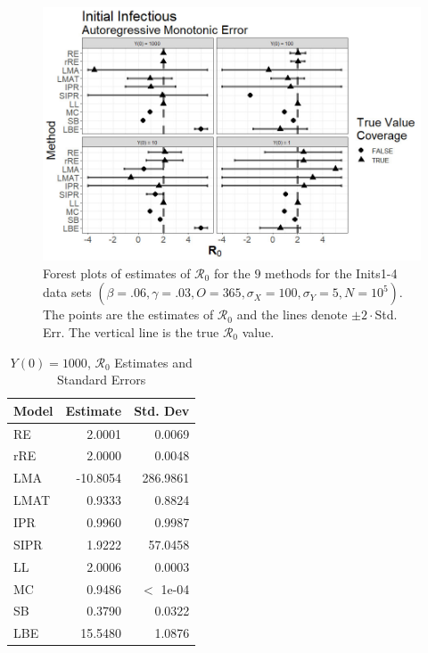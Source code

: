 \documentclass[12pt]{article}
\newcommand{\xxsir}{\ensuremath{9} } %
\newcommand{\rr}{\ensuremath{\mathcal{R}_0}}
\begin{document}
\begin{figure}[H]
	\centering
	\includegraphics[scale=0.5]{images/start_arm.jpg}
	\caption{Forest plots of estimates of $\rr$ for the \xxsir methods for the Inits1-4 data sets $(\beta=.06, \gamma=.03, O=365, \sigma_X=100, \sigma_Y=5, N=10^5)$.  The points are the estimates of $\rr$ and the lines denote $\pm 2\cdot $Std. Err.  The vertical line is the true $\rr$ value.}
\end{figure}


\begin{table}[H]
	
	\centering
	\begin{tabular}[t]{l|r|r}
		\hline
		Model & Estimate & Std. Dev\\
		\hline
		RE & 2.0001 & 0.0069\\
		\hline
		rRE & 2.0000 & 0.0048\\
		\hline
		LMA & -10.8054 & 286.9861\\
		\hline
		LMAT & 0.9333 & 0.8824\\
		\hline
		IPR & 0.9960 & 0.9987\\
		\hline
		SIPR & 1.9222 & 57.0458\\
		\hline
		LL & 2.0006 & 0.0003\\
		\hline
		MC & 0.9486 & $<$ 1e-04\\
		\hline
		SB & 0.3790 & 0.0322\\
		\hline
		LBE & 15.5480 & 1.0876\\
		\hline
	\end{tabular}
	\caption{$Y(0) = 1000$, $\rr$ Estimates and Standard Errors}
\end{table}
\end{document}
